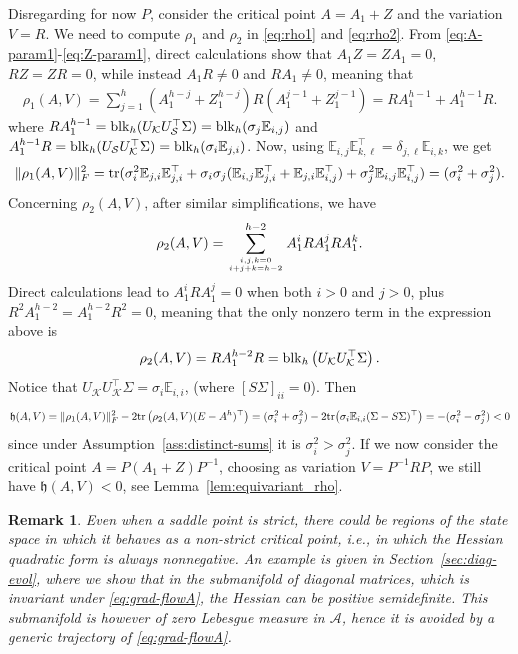 \documentclass{article}
\makeatletter
\renewenvironment{proof}[1][\proofname]{
  \par\pushQED{\qed}\normalfont
  \topsep6\p@\@plus6\p@\relax
  \trivlist\item[\hskip\labelsep\bfseries#1\@addpunct{.}]
  \ignorespaces
}{
  \popQED\endtrivlist\@endpefalse
}
\newtheorem{remark}[proposition]{Remark}
\def\tr{{\rm tr}}
\def\block{{\rm blk}}
\newcommand{\1}{\mathds{1}}
\makeatother
\begin{document}
\begin{proof}
Disregarding for now $ P$, consider the critical point $ A= A_1+Z $ and the variation $ V = R$. 
We need to compute $ \rho_1 $ and $ \rho_2 $ in \eqref{eq:rho1} and \eqref{eq:rho2}.
From \eqref{eq:A-param1}-\eqref{eq:Z-param1}, direct calculations show that $ A_1 Z = Z A_1 =0 $, $  R Z = Z R =0 $, while instead $ A_1 R \neq 0 $ and $ R A_1 \neq 0$, meaning that 
\begin{align*}
\rho_1(A,V)  =  \sum_{j=1}^{h} (A_1^{h-j} + Z_1^{h-j}) R  (A_1^{j-1} +Z_1^{j-1} ) = RA_1^{h-1} + A_1^{h-1}R. 
\end{align*}
where $ RA_1^{h-1} =  \block_h (U_\mathcal{K}U_\mathcal{S}^\top \Sigma) =  \block_h(\sigma_j \mathbb{E}_{i,j})$ and $ A_1^{h-1}R = \block_h (U_\mathcal{S}U_\mathcal{K}^\top \Sigma)= \block_h(\sigma_i \mathbb{E}_{j,i})$. Now, using $\mathbb{E}_{i,j}\mathbb{E}_{k,\ell}^\top=\delta_{j,\ell}\mathbb{E}_{i,k}$, we get $$\| \rho_1(A,V)\|_F^2 =  \tr{(\sigma_i^2 \mathbb{E}_{j,i}\mathbb{E}_{j,i}^\top + \sigma_i\sigma_j(\mathbb{E}_{i,j}\mathbb{E}_{j,i}^\top + \mathbb{E}_{j,i}\mathbb{E}_{i,j}^\top) + \sigma_j^2 \mathbb{E}_{i,j}\mathbb{E}_{i,j}^\top)} = (\sigma_i^2 + \sigma_j^2).$$
Concerning $ \rho_2(A,V)$, after similar simplifications, we have
\[
 \rho_2(A,V) =  \sum^{h-2}_{ i, j, k =0 \atop i+j+k=h-2 
} A_1^i R A_1^j R A_1^k .
\]
 Direct calculations lead to $ A_1^i R A_1^j =0 $ when both $ i >0 $ and $ j>0 $, plus $ R^2A_1^{h-2}= A_1^{h-2}R^2 =0 $, meaning that the only nonzero term in the expression above is
\[
\rho_2(A,V) =  R A_1^{h-2} R = \block_h \left( U_\mathcal{K} U_\mathcal{K}^\top \Sigma \right) .
\]
Notice that $ U_\mathcal{K} U_\mathcal{K}^\top \Sigma = \sigma_i  \mathbb{E}_{i,i} $, (where $ [S \Sigma]_{ii}=0$).
Then
\begin{equation*}
    \mathfrak{h}(A,V) =\| \rho_1(A,V)\|_F^2 - 2 \tr \left( \rho_2(A,V) (E - A^h)^\top \right) = (\sigma_i^2 + \sigma_j^2) - 2  \tr{\left( \sigma_i \mathbb{E}_{i,i} (\Sigma - S \Sigma)^\top \right) } = -(\sigma_i^2 - \sigma_j^2) < 0
\end{equation*}
since under Assumption~\ref{ass:distinct-sums} it is $\sigma_i^2 > \sigma_j^2$.
If we now consider the critical point $ A = P(A_1+Z)P^{-1}$, choosing as variation $ V = P^{-1} R P $, we still have $ \mathfrak{h}(A,V) <0$, see Lemma~\ref{lem:equivariant_rho}. 
\end{proof}


\begin{remark}
\label{rem:diag-case}
Even when a saddle point is strict, there could be regions of the state space in which it behaves as a non-strict critical point, i.e., in which the Hessian quadratic form is always nonnegative. An example is given in Section~\ref{sec:diag-evol}, where we show that in the submanifold of diagonal matrices, which is invariant under \eqref{eq:grad-flowA}, the Hessian can be positive semidefinite. This submanifold is however of zero Lebesgue measure in $ \mathcal{A} $, hence it is avoided by a generic trajectory of \eqref{eq:grad-flowA}.
\end{remark}
\end{document}
